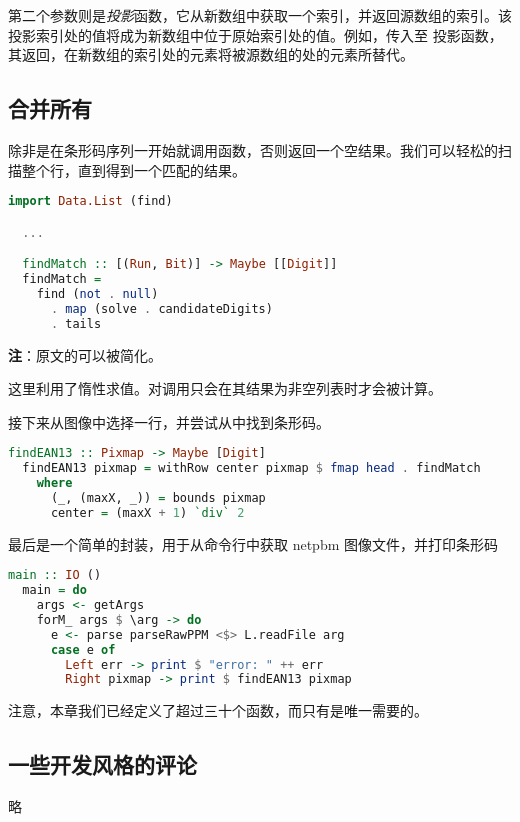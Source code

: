 \documentclass[./main.tex]{subfiles}
\begin{document}
第二个参数则是\textit{投影}函数，它从新数组中获取一个索引，并返回源数组的索引。该投影索引处的值将成为新数组中位于原始索引处的值。例如，传入至
投影函数，其返回，在新数组的索引处的元素将被源数组的处的元素所替代。

\subsection*{合并所有}

除非是在条形码序列一开始就调用函数，否则返回一个空结果。我们可以轻松的扫描整个行，直到得到一个匹配的结果。

\begin{lstlisting}[language=Haskell]
  import Data.List (find)

  ...

  findMatch :: [(Run, Bit)] -> Maybe [[Digit]]
  findMatch =
    find (not . null)
      . map (solve . candidateDigits)
      . tails
\end{lstlisting}

\textbf{注}：原文的可以被简化。

这里利用了惰性求值。对调用只会在其结果为非空列表时才会被计算。

接下来从图像中选择一行，并尝试从中找到条形码。

\begin{lstlisting}[language=Haskell]
  findEAN13 :: Pixmap -> Maybe [Digit]
  findEAN13 pixmap = withRow center pixmap $ fmap head . findMatch
    where
      (_, (maxX, _)) = bounds pixmap
      center = (maxX + 1) `div` 2
\end{lstlisting}

最后是一个简单的封装，用于从命令行中获取 netpbm 图像文件，并打印条形码

\begin{lstlisting}[language=Haskell]
  main :: IO ()
  main = do
    args <- getArgs
    forM_ args $ \arg -> do
      e <- parse parseRawPPM <$> L.readFile arg
      case e of
        Left err -> print $ "error: " ++ err
        Right pixmap -> print $ findEAN13 pixmap
\end{lstlisting}

注意，本章我们已经定义了超过三十个函数，而只有是唯一需要的。

\subsection*{一些开发风格的评论}

略
\end{document}
